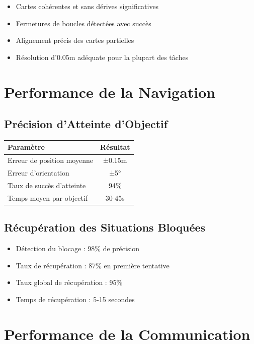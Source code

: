 \documentclass[12pt,a4paper,oneside]{report}
\begin{document}
\begin{itemize}
  \item Cartes cohérentes et sans dérives significatives
  \item Fermetures de boucles détectées avec succès
  \item Alignement précis des cartes partielles
  \item Résolution d'0.05m adéquate pour la plupart des tâches
\end{itemize}

\section{Performance de la Navigation}

\subsection{Précision d'Atteinte d'Objectif}

\begin{table}[H]
\centering
\begin{tabular}{|l|c|}
\hline
\textbf{Paramètre} & \textbf{Résultat} \\
\hline
Erreur de position moyenne & ±0.15m \\
Erreur d'orientation & ±5° \\
Taux de succès d'atteinte & 94\% \\
Temps moyen par objectif & 30-45s \\
\hline
\end{tabular}
\end{table}

\subsection{Récupération des Situations Bloquées}

\begin{itemize}
  \item Détection du blocage : 98\% de précision
  \item Taux de récupération : 87\% en première tentative
  \item Taux global de récupération : 95\%
  \item Temps de récupération : 5-15 secondes
\end{itemize}

\section{Performance de la Communication}
\end{document}
